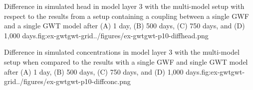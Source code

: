 \begin{StandardFigure}{Difference in simulated head in model layer 3 with the multi-model setup with respect to the results from a setup containing a coupling between a single GWF and a single GWT model after (A) 1 day, (B) 500 days, (C) 750 days, and (D) 1,000 days.}{fig:ex-gwtgwt-grid}{../figures/ex-gwtgwt-p10-diffhead.png}
\end{StandardFigure}

\begin{StandardFigure}{Difference in simulated concentrations in model layer 3 with the multi-model setup when compared to the results with a single GWF and single GWT model after (A) 1 day, (B) 500 days, (C) 750 days, and (D) 1,000 days.}{fig:ex-gwtgwt-grid}{../figures/ex-gwtgwt-p10-diffconc.png}
\end{StandardFigure}